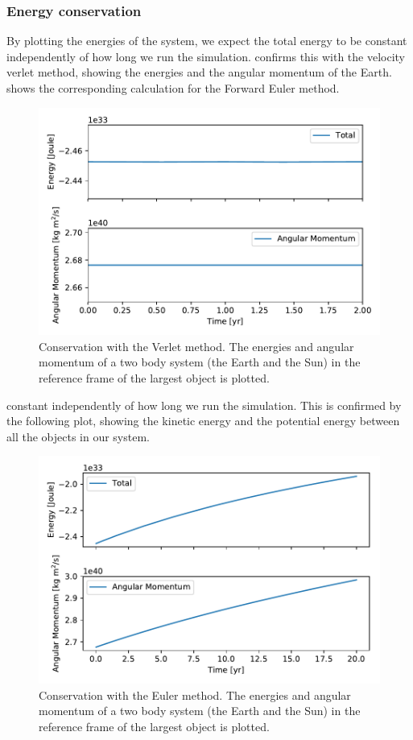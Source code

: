 \documentclass[10pt]{article}
\begin{document}
\begin{multicols}{2}
\subsubsection{Energy conservation}
By plotting the energies of the system, we expect the total energy to be
constant independently of how long we run the simulation.
confirms this with the velocity verlet method, showing the energies and the
angular momentum of the Earth.  shows the
corresponding calculation for the Forward Euler method.

\begin{figure}[htpb]
    \centering
    \includegraphics[width=0.8\linewidth]{energy_conservation_verlet.pdf}
    \caption{Conservation with the Verlet method. The energies and
        angular momentum of a two body system (the Earth and the Sun) in
        the reference frame of the largest object is plotted.}
    \label{fig:energy_verlet}
\end{figure}

constant independently of how long we run the simulation. This is confirmed
by the following plot, showing the kinetic energy and the potential energy
between all the objects in our system.

\begin{figure}[H]
    \centering
    \includegraphics[width=0.8\linewidth]{energy_conservation_euler.pdf}
    \caption{Conservation with the Euler method. The energies and angular
        momentum of a two body system (the
    Earth and the Sun) in the reference frame of the largest object is
plotted.}
    \label{fig:energy_verlet}
\end{figure}


\end{multicols}
\end{document}
